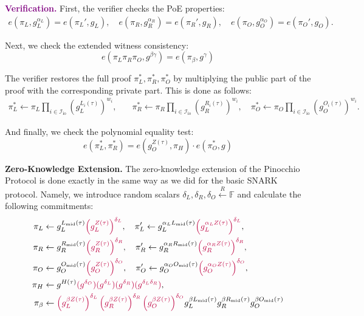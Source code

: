 \documentclass[../lecture-notes-148x210.tex]{subfiles}
\begin{document}
\textcolor{purple}{\textbf{Verification.}} First, the verifier checks the PoE properties:
\begin{align*}
    e(\pi_L, g_L^{\alpha_L}) = e(\pi_L', g_L), \quad e(\pi_R, g_R^{\alpha_R}) = e(\pi_R', g_R), \quad e(\pi_O, g_O^{\alpha_O}) = e(\pi_O', g_O).
\end{align*}

Next, we check the extended witness consistency:
\begin{equation*}
    e(\pi_L\pi_R\pi_O, g^{\beta\gamma}) = e(\pi_{\beta}, g^{\gamma})
\end{equation*}

The verifier restores the full proof $\pi_L^*,\pi_R^*,\pi_O^*$ by multiplying the public part of the proof with the corresponding private part. This is done as follows:
\begin{align*}
    \pi_L^* \gets \pi_L\prod_{i \in \mathcal{I}_{\text{io}}} (g_L^{L_i(\tau)})^{w_i}, & \quad \pi_R^* \gets \pi_R\prod_{i \in \mathcal{I}_{\text{io}}} (g_R^{R_i(\tau)})^{w_i}, \quad \pi_O^* \gets \pi_O\prod_{i \in \mathcal{I}_{\text{io}}} (g_O^{O_i(\tau)})^{w_i}.
\end{align*}

And finally, we check the polynomial equality test:
\begin{equation*}
    e(\pi_L^*, \pi_R^*) = e(g_O^{Z(\tau)}, \pi_H)\cdot e(\pi_O^*, g)
\end{equation*}

\textcolor{blue!75!gray}{\textbf{Zero-Knowledge Extension.}} The zero-knowledge extension of the Pinocchio Protocol is done exactly in the same way as we did for the basic SNARK protocol. Namely, we introduce random scalars $\delta_L, \delta_R, \delta_O \xleftarrow{R} \mathbb{F}$ and calculate the following commitments:
\begin{align*}
    \pi_L &\gets g_L^{L_{\text{mid}}(\tau)}\textcolor{purple}{\left(g_L^{Z(\tau)}\right)^{\delta_L}}, \quad \pi_L' \gets g_L^{\alpha_LL_{\text{mid}}(\tau)}\textcolor{purple}{\left(g_L^{\alpha_L Z(\tau)}\right)^{\delta_L}}, \\
    \pi_R &\gets g_R^{R_{\text{mid}}(\tau)}\textcolor{purple}{\left(g_R^{Z(\tau)}\right)^{\delta_R}}, \quad \pi_R' \gets g_R^{\alpha_RR_{\text{mid}}(\tau)}\textcolor{purple}{\left(g_R^{\alpha_R Z(\tau)}\right)^{\delta_R}}, \\
    \pi_O &\gets g_O^{O_{\text{mid}}(\tau)}\textcolor{purple}{\left(g_O^{Z(\tau)}\right)^{\delta_O}}, \quad \pi_O' \gets g_O^{\alpha_OO_{\text{mid}}(\tau)}\textcolor{purple}{\left(g_O^{\alpha_O Z(\tau)}\right)^{\delta_O}}, \\
    \pi_H &\gets g^{H(\tau)}\textcolor{purple}{(g^{\delta_O})(g^{\delta_L})(g^{\delta_R})(g^{\delta_L\delta_R})}, \\ 
    \pi_{\beta} &\gets \textcolor{purple}{\left(g_L^{\beta Z(\tau)}\right)^{\delta_L}\left(g_R^{\beta Z(\tau)}\right)^{\delta_R}\left(g_O^{\beta Z(\tau)}\right)^{\delta_O}}g_L^{\beta L_{\text{mid}}(\tau)}g_R^{\beta R_{\text{mid}}(\tau)}g_O^{\beta O_{\text{mid}}(\tau)}
\end{align*}
\end{document}
